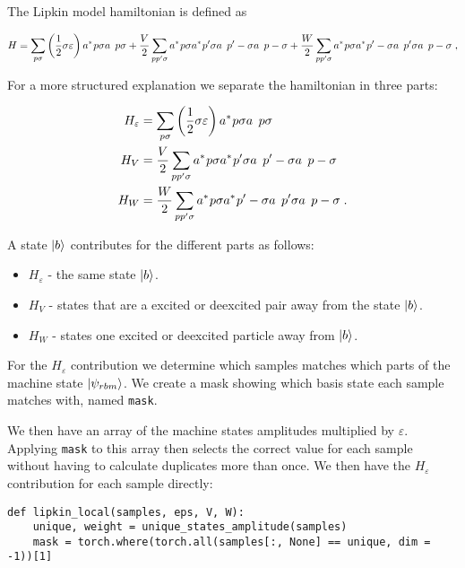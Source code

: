 The Lipkin model hamiltonian is defined as

\begin{equation} 
    H = \sum_{p\sigma} \left ( \frac{1}{2} \sigma \varepsilon \right ) \hc{a}{p\sigma}\op{a}{p\sigma} + \frac{V}{2}\sum_{pp'\sigma} \hc{a}{p\sigma} \hc{a}{p'\sigma} \op{a}{p'-\sigma}\op{a}{p-\sigma} + \frac{W}{2} \sum_{pp'\sigma} \hc{a}{p\sigma} \hc{a}{p'-\sigma} \op{a}{p'\sigma}\op{a}{p-\sigma} \; , 
\end{equation}

For a more structured explanation we separate the hamiltonian in three parts:

\begin{align}
  H_{\varepsilon} &= \sum_{p\sigma} \left ( \frac{1}{2} \sigma \varepsilon \right ) \hc{a}{p\sigma}\op{a}{p\sigma}\\ 
  H_V &= \frac{V}{2}\sum_{pp'\sigma} \hc{a}{p\sigma} \hc{a}{p'\sigma} \op{a}{p'-\sigma}\op{a}{p-\sigma}\\
  H_W &= \frac{W}{2} \sum_{pp'\sigma} \hc{a}{p\sigma} \hc{a}{p'-\sigma} \op{a}{p'\sigma}\op{a}{p-\sigma}  \; .
  \label{eq:LMG_split_H}
\end{align}

 A state $\ket{b}$ contributes for the different parts as follows:

\begin{itemize}
  \item $H_{\varepsilon}$ - the same state $\ket{b}$.
  \item $H_V$ - states that are a excited or deexcited pair away from the state $\ket{b}$.
  \item $H_W$ - states one excited or deexcited particle away from $\ket{b}$.
\end{itemize}

For the $H_{\varepsilon}$ contribution we determine which samples matches which parts of the machine state $\ket{\psi_{rbm}}$. We create a mask showing which basis state each sample matches with, named \texttt{mask}.

We then have an array of the machine states amplitudes multiplied by $\varepsilon$. Applying \texttt{mask} to this array then selects the correct value for each sample without having to calculate duplicates more than once. We then have the $H_{\varepsilon}$ contribution for each sample directly:

\begin{verbatim}
def lipkin_local(samples, eps, V, W):
    unique, weight = unique_states_amplitude(samples)
    mask = torch.where(torch.all(samples[:, None] == unique, dim = -1))[1]
\end{verbatim}

